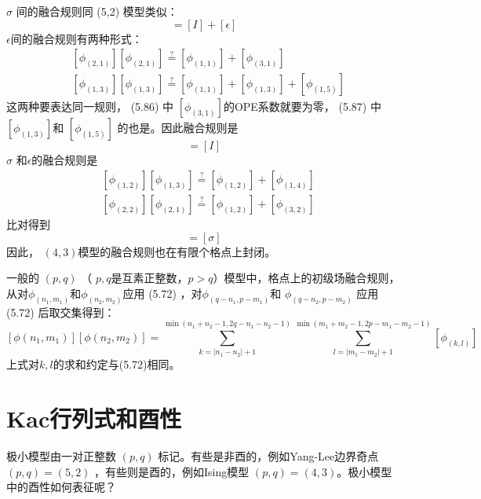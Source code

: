 $\sigma$ 间的融合规则同 (5,2) 模型类似：
\begin{equation}
	[\sigma][\sigma]=[I]+[\epsilon]
\end{equation}
$\epsilon $间的融合规则有两种形式：
\begin{align} &{\left[\phi_{(2,1)}\right]\left[\phi_{(2,1)}\right] \stackrel{?}{=}\left[\phi_{(1,1)}\right]+\left[\phi_{(3,1)}\right]}\\& {\left[\phi_{(1,3)}\right]\left[\phi_{(1,3)}\right] \stackrel{?}{=}\left[\phi_{(1,1)}\right]+\left[\phi_{(1,3)}\right]+\left[\phi_{(1,5)}\right] } \end{align}
这两种要表达同一规则， (5.86) 中 $\left[\phi_{(3,1)}\right] $的OPE系数就要为零， (5.87) 中 $\left[\phi_{(1,3)}\right] $和 $\left[\phi_{(1,5)}\right]$ 的也是。因此融合规则是
\begin{equation}
	[\epsilon][\epsilon]=[I]
\end{equation}
$\sigma$ 和$ \epsilon $的融合规则是
\begin{align} &\left[\phi_{(1,2)}\right]\left[\phi_{(1,3)}\right] \stackrel{?}{=}\left[\phi_{(1,2)}\right]+\left[\phi_{(1,4)}\right]\\& \left[\phi_{(2,2)}\right]\left[\phi_{(2,1)}\right] \stackrel{?}{=}\left[\phi_{(1,2)}\right]+\left[\phi_{(3,2)}\right] \end{align}
比对得到
\begin{equation}
	[\sigma][\epsilon]=[\sigma]
\end{equation}
因此， $(4,3) $模型的融合规则也在有限个格点上封闭。

一般的 $(p,q)$ （ $p,q $是互素正整数，$ p>q $）模型中，格点上的初级场融合规则，从对$ \phi_{\left(n_{1}, m_{1}\right)} $和$ \phi_{\left(n_{2}, m_{2}\right)} $应用 (5.72) ，对$ \phi_{\left(q-n_{1}, p-m_{1}\right)} $和 $\phi_{\left(q-n_{2}, p-m_{2}\right)}$ 应用 (5.72) 后取交集得到：
\begin{equation}
	\left[\phi\left(n_{1}, m_{1}\right)\right]\left[\phi\left(n_{2}, m_{2}\right)\right]=\sum_{k=\left|n_{1}-n_{2}\right|+1}^{\min \left(n_{1}+n_{2}-1,2 q-n_{1}-n_{2}-1\right)}\sum_{l=\left|m_{1}-m_{2}\right|+1}^{\min \left(m_{1}+m_{2}-1,2 p-m_{1}-m_{2}-1\right)}\left[\phi_{(k, l)}\right]
\end{equation}
上式对$k,l$的求和约定与(5.72)相同。

\section{Kac行列式和酉性}
极小模型由一对正整数 $(p,q)$ 标记。有些是非酉的，例如Yang-Lee边界奇点 $(p,q)=(5,2)$ ，有些则是酉的，例如Ising模型 $(p,q)=(4,3) $。极小模型中的酉性如何表征呢？

